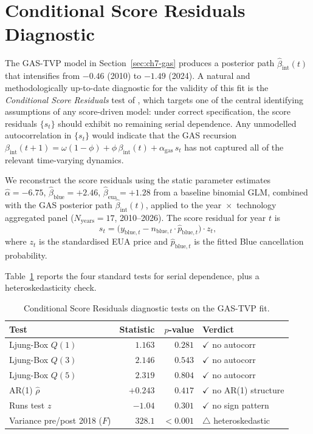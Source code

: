\section{Conditional Score Residuals Diagnostic}
\label{sec:ch7-csr}

The GAS-TVP model in Section~\ref{sec:ch7-gas} produces a posterior path $\hat\beta_{\mathrm{int}}(t)$ that intensifies from $-0.46$ (2010) to $-1.49$ (2024). A natural and methodologically up-to-date diagnostic for the validity of this fit is the \emph{Conditional Score Residuals} test of \cite{blasques2025conditional}, which targets one of the central identifying assumptions of any score-driven model: under correct specification, the score residuals $\{s_t\}$ should exhibit no remaining serial dependence. Any unmodelled autocorrelation in $\{s_t\}$ would indicate that the GAS recursion $\beta_{\mathrm{int}}(t+1) = \omega(1-\phi) + \phi\,\beta_{\mathrm{int}}(t) + \alpha_{\mathrm{gas}}\,s_t$ has not captured all of the relevant time-varying dynamics.

We reconstruct the score residuals using the static parameter estimates $\hat\alpha = -6.75$, $\hat\beta_{\mathrm{blue}} = +2.46$, $\hat\beta_{\mathrm{eua}} = +1.28$ from a baseline binomial GLM, combined with the GAS posterior path $\hat\beta_{\mathrm{int}}(t)$, applied to the year~$\times$~technology aggregated panel ($N_{\mathrm{years}} = 17$, 2010--2026). The score residual for year $t$ is
$$
s_t = \big(y_{\mathrm{blue},t} - n_{\mathrm{blue},t} \cdot \hat{p}_{\mathrm{blue},t}\big) \cdot z_t,
$$
where $z_t$ is the standardised EUA price and $\hat{p}_{\mathrm{blue},t}$ is the fitted Blue cancellation probability.

Table~\ref{tab:ch7-csr} reports the four standard tests for serial dependence, plus a heteroskedasticity check.

\begin{table}[ht]
\centering
\caption{Conditional Score Residuals diagnostic tests on the GAS-TVP fit.}
\label{tab:ch7-csr}
\begin{tabular}{lrrl}
\toprule
Test & Statistic & $p$-value & Verdict \\
\midrule
Ljung-Box $Q(1)$         & $1.163$ & $0.281$ & $\checkmark$ no autocorr \\
Ljung-Box $Q(3)$         & $2.146$ & $0.543$ & $\checkmark$ no autocorr \\
Ljung-Box $Q(5)$         & $2.319$ & $0.804$ & $\checkmark$ no autocorr \\
AR(1) $\hat\rho$         & $+0.243$ & $0.417$ & $\checkmark$ no AR(1) structure \\
Runs test $z$            & $-1.04$ & $0.301$ & $\checkmark$ no sign pattern \\
Variance pre/post 2018 ($F$) & $328.1$ & $<0.001$ & $\triangle$ heteroskedastic \\
\bottomrule
\end{tabular}
\end{table}

